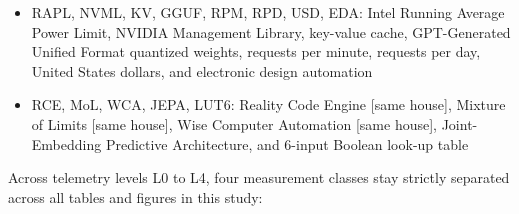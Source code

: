 \documentclass[10pt,letterpaper]{article}
\begin{document}
\begin{itemize}
  system-on-chip, process identifier, operating system, random-access
  memory, dynamic RAM, Non-Volatile Memory Express, power supply unit,
  and alternating-current wall power
\item
  RAPL, NVML, KV, GGUF, RPM, RPD, USD, EDA: Intel Running Average Power
  Limit, NVIDIA Management Library, key-value cache, GPT-Generated
  Unified Format quantized weights, requests per minute, requests per
  day, United States dollars, and electronic design automation
\item
  RCE, MoL, WCA, JEPA, LUT6: Reality Code Engine {[}same house{]},
  Mixture of Limits {[}same house{]}, Wise Computer Automation {[}same
  house{]}, Joint-Embedding Predictive Architecture, and 6-input Boolean
  look-up table
\end{itemize}

Across telemetry levels L0 to L4, four measurement classes stay strictly
separated across all tables and figures in this study:
\end{document}
